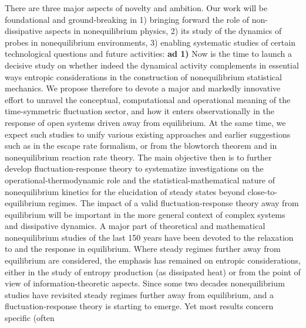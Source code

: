 
There are three major aspects of novelty and ambition. Our work will be foundational and ground-breaking in 1) bringing forward the role of non-dissipative aspects in nonequilibrium physics, 2) its study of the dynamics of probes in nonequilibrium environments, 3) enabling systematic studies of certain technological questions and future activities:
%
{\bf ad 1)} Now is the time to launch a decisive study on whether indeed the dynamical
activity complements in essential ways entropic considerations in the construction of
nonequilibrium statistical mechanics. We propose therefore to devote a major and markedly
innovative effort to unravel the conceptual, computational and operational meaning of the
time-symmetric fluctuation sector, and how it enters observationally in the response of open
systems driven away from equilibrium. At the same time, we expect such studies to unify
various existing approaches and earlier suggestions such as in the escape rate formalism, or
from the blowtorch theorem and in nonequilibrium reaction rate theory. The main objective
then is to further develop fluctuation-response theory to systematize investigations on the
operational-thermodynamic role and the statistical-mathematical nature of nonequilibrium
kinetics for the elucidation of steady states beyond close-to-equilibrium regimes. The
impact of a valid fluctuation-response theory away from equilibrium will be important in the
more general context of complex systems and dissipative dynamics.
%
A major part of theoretical and mathematical nonequilibrium studies of the last 150 years
have been devoted to the relaxation to and the response in equilibrium. Where steady regimes
further away from equilibrium are considered, the emphasis has remained on entropic
considerations, either in the study of entropy production (as dissipated heat) or from the
point of view of information-theoretic aspects.  Since some two decades nonequilibrium
studies have revisited steady regimes further away from equilibrium, and a
fluctuation-response theory is starting to emerge. Yet most results concern specific (often
